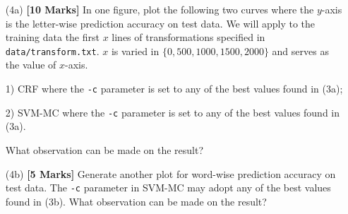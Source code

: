 \documentclass[11pt]{report}
\begin{document}
\begin{itemize}
	\item[(4a)] {\bf [10 Marks]} In one figure, plot the following two curves where the $y$-axis is the letter-wise prediction accuracy on test data.  We will apply to the training data the first $x$ lines of transformations specified in \verb#data/transform.txt#.  $x$ is varied in $\{0, 500, 1000, 1500, 2000\}$ and serves as the value of $x$-axis.
	
	1) CRF where the \verb#-c# parameter is set to any of the best values found in (3a);
	
	2) SVM-MC where the \verb#-c# parameter is set to any of the best values found in (3a).
	
	What observation can be made on the result?
	
	\item[(4b)] {\bf [5 Marks]}  Generate another plot for word-wise prediction accuracy on test data.  The \verb#-c# parameter in SVM-MC may adopt any of the best values found in (3b).
	What observation can be made on the result?
	
\end{itemize}
\end{document}
